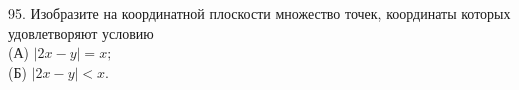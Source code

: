 95. Изобразите на координатной плоскости множество точек, координаты которых удовлетворяют условию\\
(А) $|2x-y|=x;$\\
(Б) $|2x-y|<x.$\\
